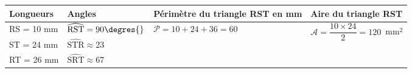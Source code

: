 \vspace{0,5cm}


\begin{tabularx}{\linewidth}{|*{4}{>{}X|}} \hline
\textbf{Longueurs} & \textbf{Angles} & \textbf{Périmètre du triangle RST en mm} & \textbf{Aire du triangle RST}\\ \hline
	
\rule[-3mm]{0mm}{10mm}RS = 10 mm & $\widehat{\mathrm{RST}} = 90\degres{}$ & \multirow{3}{*}{\rule{0mm}{12mm}$ \mathcal{P} = 10 + 24 + 36= 60$}
	& \multirow{3}{*}{\rule{0mm}{12mm}$ \mathcal{A} = \dfrac{10 \times 24}{2} = 120$~mm$^2$}
	\\ \cline{1-2}
	\rule[-3mm]{0mm}{10mm}ST = 24 mm & $\widehat{\mathrm{STR}} \approx $23\degres{}&&\\ \cline{1-2}
	\rule[-3mm]{0mm}{10mm}RT = 26 mm & $\widehat{\mathrm{SRT}} \approx $67\degres{}&&\\ \hline
	
\end{tabularx}


